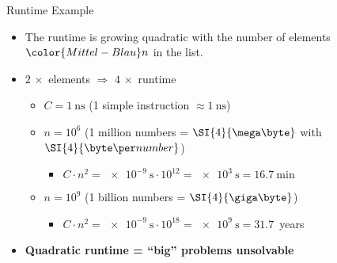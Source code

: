 \begin{frame}{Runtime Example}
  \begin{itemize}
    \item
      The runtime is growing quadratic with the number of elements
      ${\color{Mittel-Blau}n}$ in the list.\\
    \item
      $2\, \times$ elements $\Rightarrow$ $4\, \times$ runtime\\
      \begin{itemize}
        \item
          $C = \SI{1}{\nano\second}$
          (1 simple instruction $\approx \SI{1}{\nano\second}$)
        \item
          $n = 10^6$ (1 million numbers = $\SI{4}{\mega\byte}$
          with $\SI{4}{\byte\per number}$)
          \begin{itemize}
            \item
              $C \cdot n^2 = \SI{e-9}{\second} \cdot 10^{12}
              = \SI{e3}{\second} = \SI{16.7}{\minute}$
          \end{itemize}
        \item
          $n = 10^9$ (1 billion numbers = $\SI{4}{\giga\byte}$)
          \begin{itemize}
            \item
              $C \cdot n^2 = \SI{e-9}{\second} \cdot 10^{18}
              = \SI{e9}{\second} = 31.7$~years
          \end{itemize}
      \end{itemize}
    \item
      \textbf{Quadratic runtime = \enquote{big} problems unsolvable}
  \end{itemize}
\end{frame}